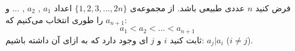 \p
        فرض کنید
        $n$
        عددی طبیعی باشد. از مجموعه‌ی
        $\{ 1,2,3,...,2n \} $
        اعداد
        $a_1$
        ,
        $a_2$
        , ...
        و
        $a_{n+1}$
        را طوری انتخاب می‌کنیم که:
        $$a_1<a_2<...<a_{n+1}$$
        \p
        ثابت کنید
        $i$
        و
        $j$
        ای
        وجود دارد که به ازای آن داشته باشیم:
        $a_j|a_i$
        ($i\neq j$).